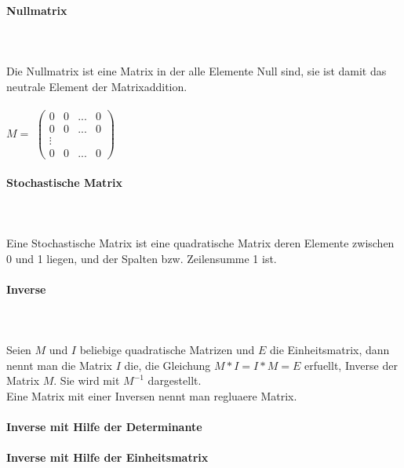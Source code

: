 \documentclass[a4paper]{article} %
\begin{document}
		\paragraph{Nullmatrix  }
		\hspace{0 cm} \\ \noindent \\
		Die Nullmatrix ist eine Matrix in der alle Elemente Null sind, sie ist damit das neutrale Element der Matrixaddition.\\
		\\$M =$
		$
		\begin{pmatrix}
		0 & 0 	& ... 	& 0\\
		0 & 0 	& ...	& 0\\
		\vdots  &      	&  \\
		0 & 0	& ...	& 0
		\end{pmatrix}
		$\\

	\paragraph{Stochastische Matrix  }
	\hspace{0 cm} \\ \noindent \\
	Eine Stochastische Matrix ist eine quadratische Matrix deren Elemente zwischen 0 und 1 liegen, und der Spalten bzw. Zeilensumme 1 ist.

	\paragraph{Inverse  }
	 \hspace{0 cm} \\ \noindent \\
	 Seien  $M$ und $I$ beliebige quadratische Matrizen und $E$ die Einheitsmatrix, dann nennt man die Matrix $I$ die, die Gleichung $M*I=I*M=E$ erfuellt, Inverse der Matrix $M$. Sie wird mit $M^{-1}$ dargestellt.\\
	 Eine Matrix mit einer Inversen nennt man regluaere Matrix.
	 \\\\\textbf{Inverse mit Hilfe der Determinante}
	 \\\\\textbf{Inverse mit Hilfe der Einheitsmatrix}
\end{document}
